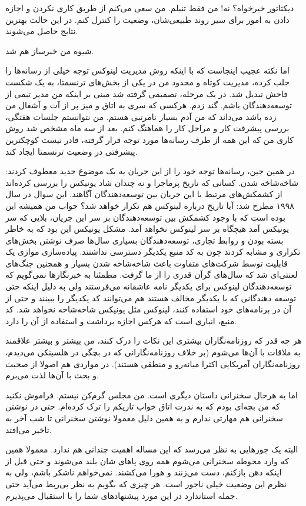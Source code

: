 دیکتاتور خیرخواه؟ نه! من فقط تنبلم. من سعی می‌کنم از طریق کاری نکردن و
اجازه دادن به امور برای سیر روند طبیعی‌شان، وضعیت را کنترل کنم. در این
حالت بهترین نتایج حاصل می‌شوند.

شیوه من خبرساز هم شد. 

اما نکته عجیب اینجاست که با اینکه روش مدیریت لینوکس توجه خیلی از
رسانه‌ها را جلب کرده، مدیریت کوتاه و محدود من در یکی از بخش‌های ترنسمتا،
به یک شکست فاحش تبدیل شد. در یک مرحله، تصمیمی گرفته شد مبنی بر اینکه
من مدیر تیمی از توسعه‌دهندگان باشم. گند زدم. هرکسی که سری به اتاق و میز
پر از آت و آشغال من زده باشد می‌داند که من آدم بسیار نامرتبی هستم. من
نتوانستم جلسات هفتگی، بررسی پیشرفت کار و مراحل کار را هماهنگ کنم. بعد
از سه ماه مشخص شد روش کاری من که این همه از طرف رسانه‌ها مورد توجه قرار
گرفته، قادر نیست کوچکترین پیشرفتی در وضعیت ترنسمتا ایجاد کند.

در همین حین، رسانه‌ها توجه خود را از این جریان به یک موضوع جدید معطوف
کردند: شاخه‌شاخه‌ شدن. کسانی که تاریخ پرماجرا و
نه چندان شاد یونیکس را بررسی کرده‌اند از کشمکش‌های مرتبط با این جریان
بین توسعه‌دهندگان آگاهند. این سوال در سال ۱۹۹۸ مطرح شد: آیا تاریخ
درباره لینوکس هم تکرار خواهد شد؟ جواب من همیشه این بوده است که با وجود
کشمکش بین توسعه‌دهندگان بر سر این جریان، بلایی که سر یونیکس آمد هیچگاه
بر سر لینوکس نخواهد آمد. مشکل یونیکس این بود که به خاطر بسته بودن و
روابط تجاری، توسعه‌دهندگان بسیاری سال‌ها صرف نوشتن بخش‌های تکراری و مشابه
کردند چون به کد منبع یکدیگر دسترسی نداشتند. پیاده‌سازی موازی یک قابلیت
توسط شرکت‌های متفاوت باعث شاخه‌شاخه‌ شدن بسیار و همچنین جنگ‌های لعنتی‌ای شد
که سال‌های گرآن قدری را از ما گرفت. مطمئنا به خبرنگارها نمی‌گویم که
توسعه‌دهندگان لینوکس برای یکدیگر نامه عاشقانه می‌فرستند ولی به دلیل
اینکه حتی توسعه دهندگانی که با یکدیگر مخالف هستند هم می‌توانند کد
یکدیگر را ببینند و حتی از آن در برنامه‌های خود استفاده کنند، لینوکس مثل
یونیکس شاخه‌شاخه نخواهد شد. کد منبع، انباری است که هرکس اجازه برداشت و
استفاده از آن را دارد.

هر چه قدر که روزنامه‌نگاران بیشتری این نکات را درک کنند، من بیشتر و
بیشتر علاقمند به ملاقات با آن‌ها می‌شوم (بر خلاف روزنامه‌نگارانی که در
بچگی در هلسینکی می‌دیدم، روزنامه‌نگاران آمریکایی اکثرا میانه‌رو و منطقی
هستند). در مواردی هم اصولا از صحبت و بحث با آن‌ها لذت می‌برم.

اما به هرحال سخنرانی داستان دیگری است. من مجلس گرم‌کن نیستم. فراموش
نکنید که من بچه‌ای بودم که به ندرت اتاق خواب تاریکم را ترک کرده‌ام. حتی
در نوشتن سخنرانی هم مهارتی ندارم و به همین دلیل معمولا نوشتن سخنرانی
تا شب آخر به تاخیر می‌افتد.

البته یک جورهایی به نظر می‌رسد که این مساله اهمیت چندانی هم
ندارد. معمولا همین که وارد محوطه سخنرانی می‌شوم همه روی پاهای شان بلند
می‌شوند و حتی قبل از اینکه دهن بازکنم، دست می‌زنند و هورا
می‌کشند. نمی‌خواهم ناشکر باشم، ولی به نظرم این وضعیت خیلی ناجور است. هر
چیزی که بگویم به نظر بی‌ربط می‌آید حتی جمله استاندارد
 در این مورد پیشنهادهای شما را با
استقبال می‌پذیرم.

